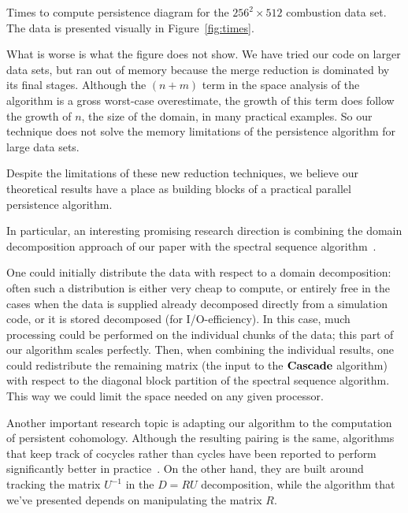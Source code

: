 \begin{table}
    \centering
    \pgfplotstabletypeset
    [
        every head row/.style={
            before row={
                \toprule
            },
            after row=\midrule,
        },
        columns={proc, time},
        columns/proc/.style         ={column name=processors, int detect, column type={r}},
        columns/time/.style         ={column name=seconds, fixed, column type={|r}},
    ]
    {\pltCombustionMed}
    \caption{Times to compute persistence diagram for the $256^2 \times 512$
             combustion data set. The data is presented visually in
             Figure~\ref{fig:times}.}
    \label{tbl:times}
\end{table}

What is worse is what the figure does not show. We have tried our code on larger
data sets, but ran out of memory because the merge reduction is dominated by its
final stages. Although the $(n+m)$ term in the space analysis of the
 algorithm is a gross worst-case overestimate, the growth of this
term does follow the growth of $n$, the size of the domain, in many practical
examples. So our technique does not solve the memory limitations of the
persistence algorithm for large data sets.

Despite the limitations of these new reduction techniques, we believe our theoretical
results have a place as building blocks of a practical parallel persistence algorithm.

In particular, an interesting promising research direction is
combining the domain decomposition approach of our paper with the spectral sequence
algorithm~\cite{EH-book,dipha}.


One could initially distribute the data with respect to a domain decomposition:
often such a distribution is either very cheap to compute, or entirely
free in the cases when the data is supplied already decomposed directly from a simulation code,
or it is stored decomposed (for I/O-efficiency). In this case, much processing
could be performed on the individual chunks of the data; this part of our
algorithm scales perfectly. Then, when combining the individual results, one
could redistribute the remaining matrix (the input to the ${\bf Cascade}$
algorithm) with respect to the diagonal block partition of the spectral sequence
algorithm. This way we could limit the space needed on any given processor.

Another important research topic is adapting our algorithm to the computation of
persistent cohomology. Although the resulting pairing is the same, algorithms
that keep track of cocycles rather than cycles have been reported to perform
significantly better in practice~\cite{dualities,compressed-annotation-matrix}.
On the other hand, they are built around tracking the matrix $U^{-1}$ in the $D=RU$
decomposition, while the algorithm that we've presented depends on manipulating
the matrix $R$.

